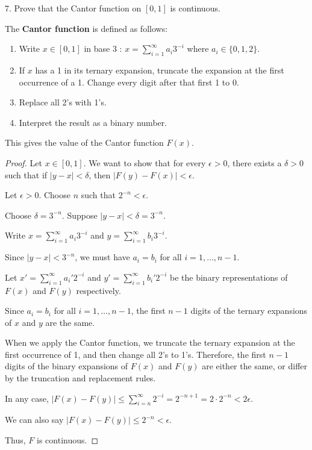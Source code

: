 \begin{exercise}
7. Prove that the Cantor function on $[0,1]$ is continuous.
\end{exercise}
\begin{definition}
The \textbf{Cantor function} is defined as follows:
	\begin{enumerate}
		\item Write $x \in[0,1]$ in base 3 : $x=\sum_{i=1}^{\infty} a_i 3^{-i}$ where $a_i \in\{0,1,2\}$.
		\item If $x$ has a 1 in its ternary expansion, truncate the expansion at the first occurrence of a 1. Change every digit after that first 1 to 0.
		\item Replace all 2's with 1's.
		\item Interpret the result as a binary number.
	\end{enumerate}
This gives the value of the Cantor function $F(x)$.
\end{definition}
\begin{proof}
Let $x \in[0,1]$. We want to show that for every $\epsilon > 0$, there exists a $\delta > 0$ such that if $|y - x| < \delta$, then $|F(y) - F(x)| < \epsilon$.

Let $\epsilon > 0$. Choose $n$ such that $2^{-n} < \epsilon$.

Choose $\delta = 3^{-n}$. Suppose $|y - x| < \delta = 3^{-n}$.

Write $x = \sum_{i=1}^\infty a_i 3^{-i}$ and $y = \sum_{i=1}^\infty b_i 3^{-i}$.

Since $|y - x| < 3^{-n}$, we must have $a_i = b_i$ for all $i = 1, \dots, n-1$.

Let $x' = \sum_{i=1}^\infty a_i' 2^{-i}$ and $y' = \sum_{i=1}^\infty b_i' 2^{-i}$ be the binary representations of $F(x)$ and $F(y)$ respectively.

Since $a_i = b_i$ for all $i = 1, \dots, n-1$, the first $n-1$ digits of the ternary expansions of $x$ and $y$ are the same.

When we apply the Cantor function, we truncate the ternary expansion at the first occurrence of 1, and then change all 2's to 1's. Therefore, the first $n-1$ digits of the binary expansions of $F(x)$ and $F(y)$ are either the same, or differ by the truncation and replacement rules.

In any case, $|F(x) - F(y)| \leq \sum_{i=n}^\infty 2^{-i} = 2^{-n+1} = 2 \cdot 2^{-n} < 2 \epsilon$.

We can also say $|F(x) - F(y)| \leq 2^{-n} < \epsilon$.

Thus, $F$ is continuous.
\end{proof}
